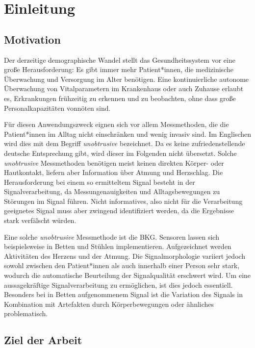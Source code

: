 \chapter{Einleitung}\label{einleitung}

\section{Motivation}

Der derzeitige demographische Wandel stellt das Gesundheitssystem vor eine große Herausforderung: Es gibt immer mehr Patient*innen, die medizinische Überwachung und Versorgung im Alter benötigen. Eine kontinuierliche autonome Überwachung von Vitalparametern im Krankenhaus oder auch Zuhause erlaubt es, Erkrankungen frühzeitig zu erkennen und zu beobachten, ohne dass große Personalkapazitäten vonnöten sind.

Für diesen Anwendungszweck eignen sich vor allem Messmethoden, die die Patient*innen %
im Alltag nicht einschränken und wenig invasiv sind. Im Englischen wird dies mit dem Begriff \textit{unobtrusive} bezeichnet. Da es keine zufriedenstellende deutsche Entsprechung gibt, wird dieser im Folgenden nicht übersetzt. Solche \textit{unobtrusive} Messmethoden benötigen meist keinen direkten Körper- oder Hautkontakt, liefern aber Information über Atmung und Herzschlag. Die Herausforderung bei einem so ermitteltem Signal besteht in der Signalverarbeitung, da Messungenauigkeiten und Alltagsbewegungen zu Störungen im Signal führen. Nicht informatives, also nicht für die Verarbeitung geeignetes Signal muss aber zwingend identifiziert werden, da die Ergebnisse stark verfälscht würden.

Eine solche \textit{unobtrusive} Messmethode ist die \acf{BKG}. Sensoren lassen sich beispielsweise in Betten und Stühlen implementieren. Aufgezeichnet werden Aktivitäten des Herzens und der Atmung. Die Signalmorphologie variiert jedoch sowohl zwischen den Patient*innen als auch innerhalb %
einer Person sehr stark, wodurch die automatische Beurteilung der Signalqualität erschwert wird. Um eine aussagekräftige Signalverarbeitung %
 zu ermöglichen, ist dies jedoch essentiell. Besonders bei in Betten aufgenommenem Signal ist die Variation des Signals in Kombination mit Artefakten durch Körperbewegungen oder ähnliches problematisch.  
 

\section{Ziel der Arbeit}

